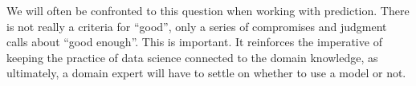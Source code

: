 \documentclass[
  letterpaper,
]{scrbook}
\begin{document}
We will often be confronted to this question when working with
prediction. There is not really a criteria for ``good'', only a series
of compromises and judgment calls about ``good enough''. This is
important. It reinforces the imperative of keeping the practice of data
science connected to the domain knowledge, as ultimately, a domain
expert will have to settle on whether to use a model or not.

\begin{figure}[pbt]

\end{figure}
\end{document}
